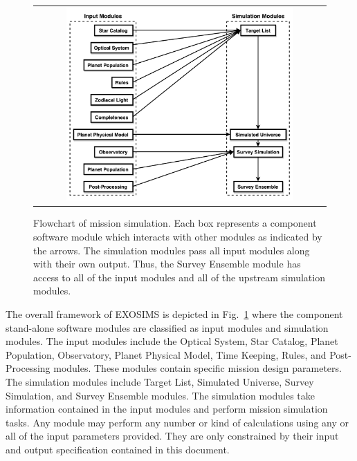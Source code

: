 \documentclass[cleanfoot]{asme2ej}
\begin{document}
\begin{figure}[ht]
    \begin{center}
        \begin{tabular}{c}
             \includegraphics[width=0.8\textwidth]{codeflow3}
        \end{tabular}
    \end{center}
    \caption{Flowchart of mission simulation. Each box represents a component software module which interacts with other modules as indicated by the arrows. The simulation modules pass all input modules along with their own output.  Thus, the Survey Ensemble module has access to all of the input modules and all of the upstream simulation modules.}
    \label{figure_framework}
\end{figure}

The overall framework of EXOSIMS is depicted in Fig.~\ref{figure_framework} where the component stand-alone software modules are classified as input modules and simulation modules.  The input modules include the Optical System, Star Catalog, Planet Population, Observatory, Planet Physical Model, Time Keeping, Rules, and Post-Processing modules.  These modules contain specific mission design parameters.  The simulation modules include Target List, Simulated Universe, Survey Simulation, and Survey Ensemble modules.  The simulation modules take information contained in the input modules and perform mission simulation tasks.  Any module may perform any number or kind of calculations using any or all of the input parameters provided.  They are only constrained by their input and output specification contained in this document.
\end{document}
